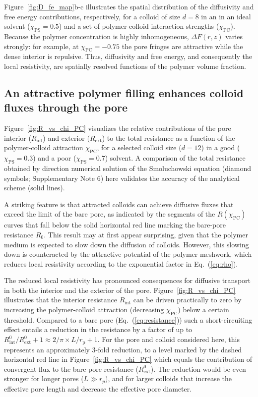 \documentclass[12pt, a4paper]{article}
\begin{document}
Figure~\ref{fig:D_fe_map}b-c illustrates the spatial distribution of the diffusivity and free energy contributions, respectively, for a colloid of size $d=8$ in an in an ideal solvent ($\chi_{\text{PS}}=0.5$) and a set of polymer-colloid interaction strengths ($\chi_{\text{PC}}$).
Because the polymer concentration is highly inhomogeneous, $\Delta F(r,z)$ varies strongly: for example, at $\chi_{\text{PC}}=-0.75$ the pore fringes are attractive while the dense interior is repulsive.  
Thus, diffusivity and free energy, and consequently the local resistivity, are spatially resolved functions of the polymer volume fraction.


\subsection{An attractive polymer filling enhances colloid fluxes through the pore}

Figure~\ref{fig:R_vs_chi_PC} visualizes the relative contributions of the pore interior ($R_{\text{int}}$) and exterior ($R_{\text{ext}}$) to the total resistance as a function of the polymer-colloid attraction $\chi_\text{PC}$, for a selected colloid size ($d = 12$) in a good ($\chi_\text{PS} = 0.3$) and a poor ($\chi_\text{PS} = 0.7$) solvent.
A comparison of the total resistance obtained by direction numerical solution of the Smoluchowski equation (diamond symbols; Supplementary Note 6) here validates the accuracy of the analytical scheme (solid lines).

A striking feature is that attracted colloids can achieve diffusive fluxes that exceed the limit of the bare pore, as indicated by the segments of the $R(\chi_{\text{PC}})$ curves that fall below the solid horizontal red line marking the bare-pore resistance $R_{0}$.
This result may at first appear surprising, given that the polymer medium is expected to slow down the diffusion of colloids.
However, this slowing down is counteracted by the attractive potential of the polymer meshwork, which reduces local resistivity according to the exponential factor in Eq.~(\ref{eq:rho}).

The reduced local resistivity has pronounced consequences for diffusive transport in both the interior and the exterior of the pore.
Figure~\ref{fig:R_vs_chi_PC} illustrates that the interior resistance $R_{\text{int}}$ can be driven practically to zero by increasing the polymer-colloid attraction (decreasing $\chi_\text{PC}$) below a certain threshold.
Compared to a bare pore (Eq.~(\ref{eq:resistance})) such a short-circuiting effect entails a reduction in the resistance by a factor of up to $R^0_{\text{int}}/R^0_{\text{ext}}+1 \approx 2/\pi \times L / r_{\text{p}} + 1$.
For the pore and colloid considered here, this represents an approximately 3-fold reduction, to a level marked by the dashed horizontal red line in Figure~\ref{fig:R_vs_chi_PC} which equals the contribution of convergent flux to the bare-pore resistance ($R^0_\text{ext}$).
The reduction would be even stronger for longer pores ($L\gg r_p$), and for larger colloids that increase the effective pore length and decrease the effective pore diameter.
\end{document}
